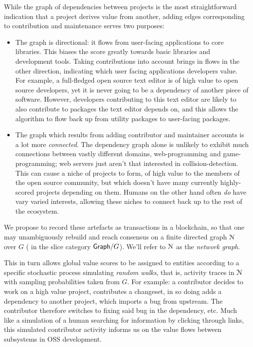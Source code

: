 While the graph of dependencies between projects is the most straightforward
indication that a project derives value from another, adding edges corresponding
to contribution and maintenance serves two purposes:
\begin{itemize}
\item The graph is directional: it flows from user-facing applications to core
  libraries. This biases the score greatly towards basic libraries and
  development tools. Taking contributions into account brings in flows in the
  other direction, indicating which user facing applications developers
  value. For example, a full-fledged open source text editor is of high value
  to open source developers, yet it is never going to be a dependency of
  another piece of software. However, developers contributing to this text
  editor are likely to also contribute to packages the text editor depends
  on, and this allows the algorithm to flow back up from utility packages to
  user-facing packages.
\item The graph which results from adding contributor and maintainer accounts
  is a lot more \emph{connected}. The dependency graph alone is unlikely to
  exhibit much connections between vastly different domains, \eg{}
  web-programming and game-programming; web servers just aren't that
  interested in collision-detection. This can cause a niche of projects to
  form, of high value to the members of the open source community, but which
  doesn't have many currently highly-scored projects depending on them.
  Humans on the other hand often \emph{do} have vary varied interests,
  allowing these niches to connect back up to the rest of the ecosystem.
\end{itemize}
We propose to record these artefacts as transactions in a blockchain, so that
one may unambiguously rebuild and reach consensus on a finite directed graph
$\mathcal{N}$ over $G$ (\ie{} in the slice category $\mathsf{Graph}/G$). We'll refer to
$\mathcal{N}$ as the \emph{network graph}.

This in turn allows global value scores to be assigned to entities
according to a specific stochastic process simulating \emph{random
  walks}, that is, activity traces in $\mathcal{N}$ with sampling
probabilities taken from $G$. For example: a contributor decides to
work on a high value project, contributes a changeset, in so doing adds a
dependency to another project, which imports a bug from upstream. The
contributor therefore switches to fixing said bug in the dependency, etc. Much
like a simulation of a human searching for information by clicking through
links, this simulated contributor activity informs us on the value flows
between subsystems in OSS development.

